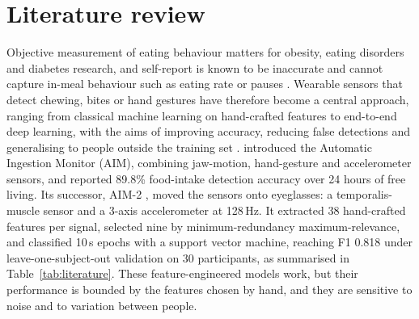 \section{Literature review}
\label{sec:review}

Objective measurement of eating behaviour matters for obesity, eating
disorders and diabetes research, and self-report is known to be inaccurate
and cannot capture in-meal behaviour such as eating rate or pauses
\citep{diou2022intake}. Wearable sensors that detect chewing, bites or hand
gestures have therefore become a central approach, ranging from
classical machine learning on hand-crafted features to end-to-end deep
learning, with the aims of improving accuracy, reducing false detections
and generalising to people outside the training set \citep{bell2020scoping}.
\citet{fontana2014aim} introduced the Automatic Ingestion Monitor (AIM),
combining jaw-motion, hand-gesture and accelerometer sensors, and reported
89.8\% food-intake detection accuracy over 24 hours of free living. Its
successor, AIM-2 \citep{doulah2021aim2}, moved the sensors onto eyeglasses:
a temporalis-muscle sensor and a 3-axis accelerometer at 128\,Hz. It extracted
38 hand-crafted features per signal, selected nine by minimum-redundancy
maximum-relevance, and classified 10\,s epochs with a support vector machine,
reaching F1 0.818 under leave-one-subject-out validation on 30 participants,
as summarised in Table~\ref{tab:literature}. These feature-engineered models
work, but their performance is bounded by the features chosen by hand, and
they are sensitive to noise and to variation between people.

